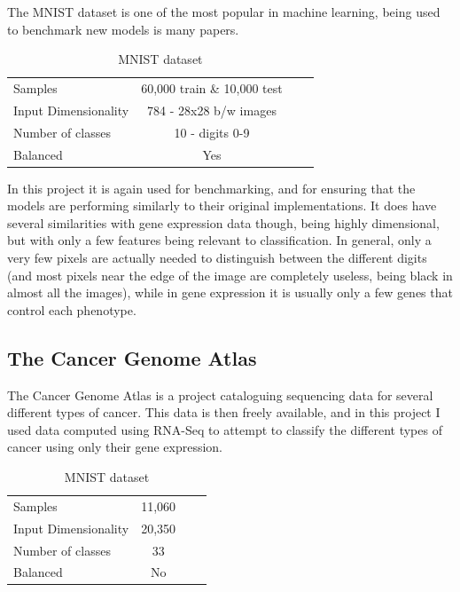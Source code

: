 \documentclass[12pt,a4paper,twoside,openright]{report}
\begin{document}
The MNIST dataset is one of the most popular in machine learning, being used to benchmark new models is many papers.

\begin{table}[H]
  \label{tab:requirements}
  \small %
  \centering %
  \begin{tabular}{lccr} %
  \toprule[\heavyrulewidth]
  Samples & 60,000 train \& 10,000 test \\
  Input Dimensionality & 784 - 28x28 b/w images  \\
  Number of classes & 10 - digits 0-9 \\
  Balanced & Yes \\
  \bottomrule[\heavyrulewidth] 
  \end{tabular}
  \caption{MNIST dataset} 
\end{table}

In this project it is again used for benchmarking, and for ensuring that the models are performing similarly to their original implementations.
It does have several similarities with gene expression data though, being highly dimensional, but with only a few features being relevant to 
classification. In general, only a very few pixels are actually needed to distinguish between the different digits (and most pixels near the 
edge of the image are completely useless, being black in almost all the images), while in gene expression it is usually only a few genes 
that control each phenotype.

\subsection{The Cancer Genome Atlas}

The Cancer Genome Atlas is a project cataloguing sequencing data for several different types of cancer. This data is then freely available,
and in this project I used data computed using RNA-Seq to attempt to classify the different types of cancer using only their gene expression.

\begin{table}[H]
  \label{tab:requirements}
  \small %
  \centering %
  \begin{tabular}{lccr} %
  \toprule[\heavyrulewidth]
  Samples & 11,060 \\
  Input Dimensionality & 20,350 \\
  Number of classes & 33 \\
  Balanced & No \\
  \bottomrule[\heavyrulewidth] 
  \end{tabular}
  \caption{MNIST dataset} 
\end{table}
\end{document}
